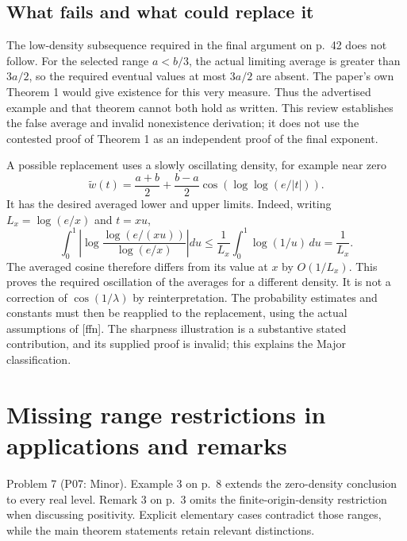 \documentclass[10pt]{article}
\begin{document}
\subsection*{What fails and what could replace it}
The low-density subsequence required in the final argument on p. 42 does not follow. For the selected range \(a<b/3\), the actual limiting average is greater than \(3a/2\), so the required eventual values at most \(3a/2\) are absent. The paper’s own Theorem 1 would give existence for this very measure. Thus the advertised example and that theorem cannot both hold as written. This review establishes the false average and invalid nonexistence derivation; it does not use the contested proof of Theorem 1 as an independent proof of the final exponent.\par
A possible replacement uses a slowly oscillating density, for example near zero \[\widetilde w(t)=\frac{a+b}{2}
    +\frac{b-a}{2}\cos\!\left(\log\log(e/|t|)\right).\] It has the desired averaged lower and upper limits. Indeed, writing \(L_x=\log(e/x)\) and \(t=xu\), \[\int_0^1
 \left|\log\frac{\log(e/(xu))}{\log(e/x)}\right|du
 \le\frac1{L_x}\int_0^1\log(1/u)\,du=\frac1{L_x}.\] The averaged cosine therefore differs from its value at \(x\) by \(O(1/L_x)\). This proves the required oscillation of the averages for a different density. It is not a correction of \(\cos(1/\lambda)\) by reinterpretation. The probability estimates and constants must then be reapplied to the replacement, using the actual assumptions of [ffn]. The sharpness illustration is a substantive stated contribution, and its supplied proof is invalid; this explains the Major classification.\par
\section*{Missing range restrictions in applications and remarks}
Problem 7 (P07: Minor).  Example 3 on p. 8 extends the zero-density conclusion to every real level. Remark 3 on p. 3 omits the finite-origin-density restriction when discussing positivity. Explicit elementary cases contradict those ranges, while the main theorem statements retain relevant distinctions.\par
\end{document}
